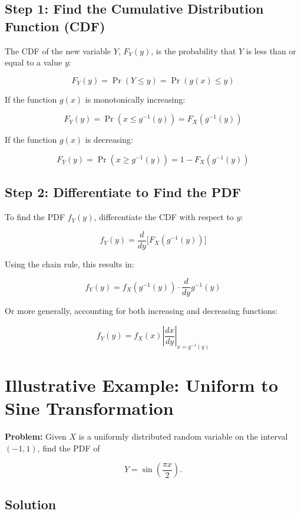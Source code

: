 \documentclass[11pt]{article}
\begin{document}
\subsection{Step 1: Find the Cumulative Distribution Function (CDF)}

The CDF of the new variable $Y$, $F_Y(y)$, is the probability that $Y$ is less than or equal to a value $y$:

\[
F_Y(y) = \Pr(Y \le y) = \Pr(g(x) \le y)
\]

If the function $g(x)$ is monotonically increasing:

\[
F_Y(y) = \Pr(x \le g^{-1}(y)) = F_X(g^{-1}(y))
\]

If the function $g(x)$ is decreasing:

\[
F_Y(y) = \Pr(x \ge g^{-1}(y)) = 1 - F_X(g^{-1}(y))
\]


\subsection{Step 2: Differentiate to Find the PDF}

To find the PDF $f_Y(y)$, differentiate the CDF with respect to $y$:

\[
f_Y(y) = \frac{d}{dy}\Big[F_X(g^{-1}(y))\Big]
\]

Using the chain rule, this results in:

\[
f_Y(y) = f_X(g^{-1}(y)) \cdot \frac{d}{dy}g^{-1}(y)
\]

Or more generally, accounting for both increasing and decreasing functions:

\[
f_Y(y) = f_X(x)\left|\frac{dx}{dy}\right|_{x=g^{-1}(y)}
\]


\section{Illustrative Example: Uniform to Sine Transformation}

\textbf{Problem:}  
Given $X$ is a uniformly distributed random variable on the interval $(-1,1)$, find the PDF of

\[
Y = \sin\left(\frac{\pi x}{2}\right).
\]

\subsection{Solution}
\end{document}
